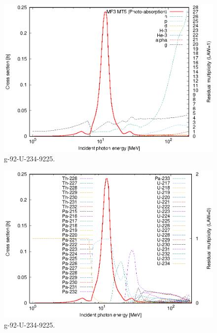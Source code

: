 \begin{figure}
 \includegraphics[width=\linewidth]{eps/g_92-U-234_9225.eps}
  \caption{g-92-U-234-9225.}
\end{figure}
\begin{figure}
 \includegraphics[width=\linewidth]{eps-law0/g_92-U-234_9225.eps}
 \caption{g-92-U-234-9225.}
\end{figure}
\newpage \clearpage

